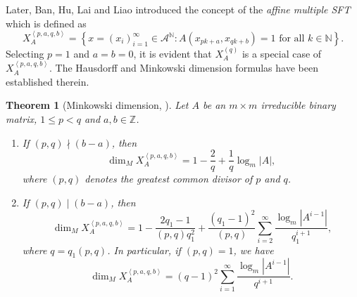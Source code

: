 \documentclass{amsart}
\newtheorem{theorem}{Theorem}[section]
\theoremstyle{definition}
\numberwithin{equation}{section}%
\begin{document}
Later, Ban, Hu, Lai and Liao \cite{ban2024hausdorffaffine} introduced the concept of the \emph{affine
multiple SFT} which is defined as
\[
X_{A}^{\left\langle p,a,q,b\right\rangle }=\left\{ x=(x_i)_{i=1}^\infty\in \mathcal{A}^{\mathbb{N}}:A(x_{pk+a},x_{qk+b})=1\text{ for all }k\in \mathbb{N}\right\} 
\text{.} 
\]
Selecting $p=1$ and $a=b=0$, it is evident that $X_{A}^{(q)}$ is a special case of $X_{A}^{\left\langle p,a,q,b\right\rangle }$.  The Hausdorff and Minkowski dimension formulas have been established therein.

\begin{theorem}[Minkowski dimension, \cite{ban2024hausdorffaffine}]\label{Thm: 4}
Let $A$ be an $m\times m$ irreducible binary matrix, $1\leq p<q$ and $a,b\in \mathbb{Z}$.
\begin{enumerate}
\item If $(p,q)\nmid (b-a)$, then 
\[
\dim _{M}X_{A}^{\left\langle p,a,q,b\right\rangle }=1-\frac{2}{q}+\frac{1}{q}\log_{m}\left\vert A\right\vert,
\]
where $(p,q)$ denotes the greatest common divisor of $p$ and $q$.

\item If $(p,q)\mid (b-a)$, then 
\[
\dim _{M}X_{A}^{\left\langle p,a,q,b\right\rangle }=1-\frac{2q_{1}-1}{(p,q)q_{1}^{2}}+\frac{(q_{1}-1)^{2}}{(p,q)}\sum_{i=2}^{\infty }\frac{\log
_{m}\left\vert A^{i-1}\right\vert }{q_{1}^{i+1}}\text{,} 
\]
where $q=q_{1}(p,q)$. In particular, if $(p,q)=1$, we have 
\begin{equation*}
\dim _{M}X_{A}^{\left\langle p,a,q,b\right\rangle
}=(q-1)^{2}\sum_{i=1}^{\infty }\frac{\log_{m}\left\vert A^{i-1}\right\vert 
}{q^{i+1}}\text{.}
\end{equation*}
\end{enumerate}
\end{theorem}
\end{document}
